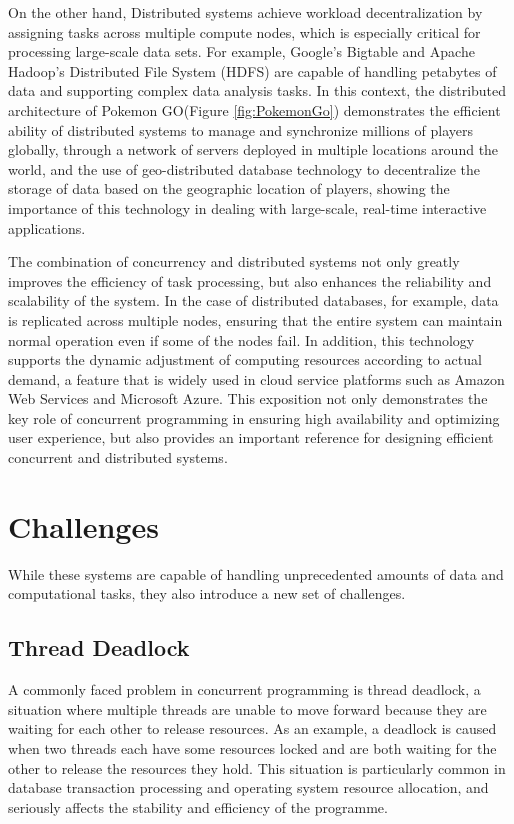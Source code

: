 \documentclass{l4proj}
\begin{document}
On the other hand, Distributed systems achieve workload decentralization by assigning tasks across multiple compute nodes, which is especially critical for processing large-scale data sets. For example, Google's Bigtable and Apache Hadoop's Distributed File System (HDFS) are capable of handling petabytes of data and supporting complex data analysis tasks. In this context, the distributed architecture of Pokemon GO(Figure \ref{fig:PokemonGo}) demonstrates the efficient ability of distributed systems to manage and synchronize millions of players globally, through a network of servers deployed in multiple locations around the world, and the use of geo-distributed database technology to decentralize the storage of data based on the geographic location of players, showing the importance of this technology in dealing with large-scale, real-time interactive applications.
		
The combination of concurrency and distributed systems not only greatly improves the efficiency of task processing, but also enhances the reliability and scalability of the system. In the case of distributed databases, for example, data is replicated across multiple nodes, ensuring that the entire system can maintain normal operation even if some of the nodes fail. In addition, this technology supports the dynamic adjustment of computing resources according to actual demand, a feature that is widely used in cloud service platforms such as Amazon Web Services and Microsoft Azure. This exposition not only demonstrates the key role of concurrent programming in ensuring high availability and optimizing user experience, but also provides an important reference for designing efficient concurrent and distributed systems.

\section{Challenges}

While these systems are capable of handling unprecedented amounts of data and computational tasks, they also introduce a new set of challenges. 

\subsection{Thread Deadlock}

A commonly faced problem in concurrent programming is thread deadlock, a situation where multiple threads are unable to move forward because they are waiting for each other to release resources. As an example, a deadlock is caused when two threads each have some resources locked and are both waiting for the other to release the resources they hold. This situation is particularly common in database transaction processing and operating system resource allocation, and seriously affects the stability and efficiency of the programme.
\end{document}
